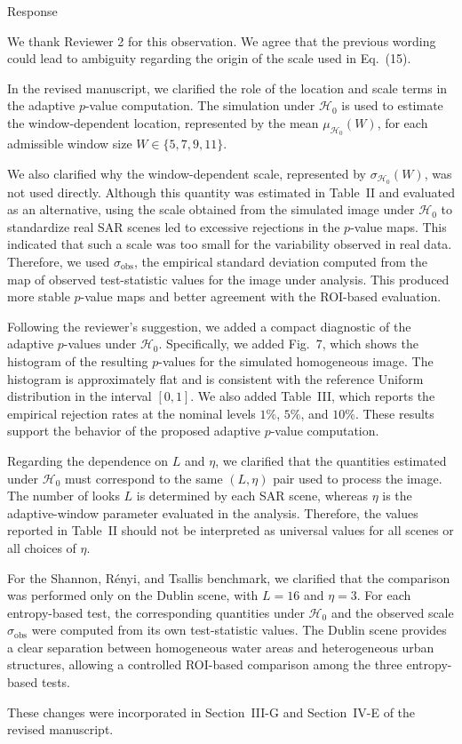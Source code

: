 \documentclass[11pt]{report}
\begin{document}
\begin{responsebox}{Response}

We thank Reviewer 2 for this observation. We agree that the previous wording could lead to ambiguity regarding the origin of the scale used in Eq.~(15).

In the revised manuscript, we clarified the role of the location and scale terms in the adaptive $p$-value computation.
The simulation under $\mathcal H_0$ is used to estimate the window-dependent location, represented by the mean $\mu_{\mathcal H_0}(W)$, for each admissible window size $W\in\{5,7,9,11\}$.

We also clarified why the window-dependent scale, represented by $\sigma_{\mathcal H_0}(W)$, was not used directly.
Although this quantity was estimated in Table~II and evaluated as an alternative, using the scale obtained from the simulated image under $\mathcal H_0$ to standardize real SAR scenes led to excessive rejections in the $p$-value maps.
This indicated that such a scale was too small for the variability observed in real data.
Therefore, we used $\sigma_{\mathrm{obs}}$, the empirical standard deviation computed from the map of observed test-statistic values for the image under analysis.
This produced more stable $p$-value maps and better agreement with the ROI-based evaluation.

Following the reviewer's suggestion, we added a compact diagnostic of the adaptive $p$-values under $\mathcal H_0$.
Specifically, we added Fig.~7, which shows the histogram of the resulting $p$-values for the simulated homogeneous image.
The histogram is approximately flat and is consistent with the reference Uniform distribution in the interval $[0,1]$.
We also added Table~III, which reports the empirical rejection rates at the nominal levels $1\%$, $5\%$, and $10\%$.
These results support the behavior of the proposed adaptive $p$-value computation.

Regarding the dependence on $L$ and $\eta$, we clarified that the quantities estimated under $\mathcal H_0$ must correspond to the same $(L,\eta)$ pair used to process the image.
The number of looks $L$ is determined by each SAR scene, whereas $\eta$ is the adaptive-window parameter evaluated in the analysis.
Therefore, the values reported in Table~II should not be interpreted as universal values for all scenes or all choices of $\eta$.

For the Shannon, R\'enyi, and Tsallis benchmark, we clarified that the comparison was performed only on the Dublin scene, with $L=16$ and $\eta=3$.
For each entropy-based test, the corresponding quantities under $\mathcal H_0$ and the observed scale $\sigma_{\mathrm{obs}}$ were computed from its own test-statistic values.
The Dublin scene provides a clear separation between homogeneous water areas and heterogeneous urban structures, allowing a controlled ROI-based comparison among the three entropy-based tests.

These changes were incorporated in Section~III-G and Section~IV-E of the revised manuscript.

\end{responsebox}
\end{document}
